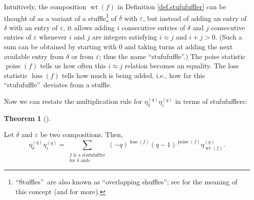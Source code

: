 \documentclass[numbers=enddot,12pt,final,onecolumn,notitlepage]{scrartcl}%
\theoremstyle{definition}
\newtheorem{theo}{Theorem}[section]
\newenvironment{theorem}[1][]
{\begin{theo}[#1]\begin{leftbar}}
{\end{leftbar}\end{theo}}
\let\sumnonlimits\sum
\renewcommand{\sum}{\sumnonlimits\limits}
\begin{document}
Intuitively, the composition $\operatorname*{wt}\left(  f\right)  $ in
Definition \ref{def.stufufuffler} can be thought of as a variant of a
stuffle\footnote{\textquotedblleft Stuffles\textquotedblright\ are also known
as \textquotedblleft overlapping shuffles\textquotedblright; see
\cite[Proposition 5.1.3 and Example 5.1.4]{GriRei} for the meaning of this
concept (and \cite{DEMT17} for more).} of $\delta$ with $\varepsilon$, but
instead of adding an entry of $\delta$ with an entry of $\varepsilon$, it
allows adding $i$ consecutive entries of $\delta$ and $j$ consecutive entries
of $\varepsilon$ whenever $i$ and $j$ are integers satisfying $i\approx j$ and
$i+j>0$. (Such a sum can be obtained by starting with $0$ and taking turns at
adding the next available entry from $\delta$ or from $\varepsilon$; thus the
name \textquotedblleft stufufuffle\textquotedblright.) The poise statistic
$\operatorname*{poise}\left(  f\right)  $ tells us how often this $i\approx j$
relation becomes an equality. The loss statistic $\operatorname*{loss}\left(
f\right)  $ tells how much is being added, i.e., how far this
\textquotedblleft stufufuffle\textquotedblright\ deviates from a stuffle.

Now we can restate the multiplication rule for $\eta_{\delta}^{\left(
q\right)  }\eta_{\varepsilon}^{\left(  q\right)  }$ in terms of stufufufflers:

\begin{theorem}
\label{thm.etaaetab}Let $\delta$ and $\varepsilon$ be two compositions. Then,%
\[
\eta_{\delta}^{\left(  q\right)  }\eta_{\varepsilon}^{\left(  q\right)  }%
=\sum_{\substack{f\text{ is a stufufuffler}\\\text{for }\delta\text{ and
}\varepsilon}}\left(  -q\right)  ^{\operatorname*{loss}\left(  f\right)
}\left(  q-1\right)  ^{\operatorname*{poise}\left(  f\right)  }\eta
_{\operatorname*{wt}\left(  f\right)  }^{\left(  q\right)  }.
\]

\end{theorem}
\end{document}
